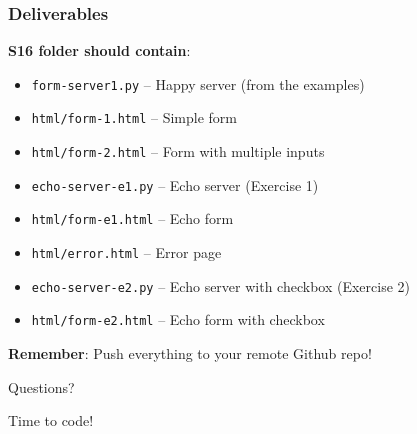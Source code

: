 \documentclass[xcolor=table]{beamer}
\begin{document}
\begin{frame}
\frametitle{Deliverables}

\textbf{S16 folder should contain}:

\vspace{0.2cm}

\begingroup\small
\begin{itemize}
\item \texttt{form-server1.py} -- Happy server (from the examples)
\item \texttt{html/form-1.html} -- Simple form
\item \texttt{html/form-2.html} -- Form with multiple inputs
\item \texttt{echo-server-e1.py} -- Echo server (Exercise 1)
\item \texttt{html/form-e1.html} -- Echo form
\item \texttt{html/error.html} -- Error page
\item \texttt{echo-server-e2.py} -- Echo server with checkbox (Exercise 2)
\item \texttt{html/form-e2.html} -- Echo form with checkbox
\end{itemize}
\endgroup

\vspace{0.3cm}

\textbf{Remember}: Push everything to your remote Github repo!

\end{frame}


\begin{frame}
\begin{center}
\Huge{Questions?}

\vspace{1cm}

\Large{Time to code!}
\end{center}
\end{frame}
\end{document}
